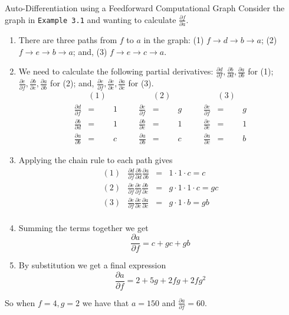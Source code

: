 \documentclass[11pt,a4paper]{article}
\begin{document}
  \begin{example}{Auto-Differentiation using a Feedforward Computational Graph}
    Consider the graph in \texttt{Example 3.1} and wanting to calculate $\frac{\partial f}{\partial a}$.
    \begin{enumerate}
      \item There are three paths from $f$ to $a$ in the graph: (1) $f\to d\to b\to a$; (2) $f\to e\to b\to a$; and, (3) $f\to e\to c\to a$.
      \item We need to calculate the following partial derivatives: $\frac{\partial d}{\partial f},\frac{\partial b}{\partial d},\frac{\partial a}{\partial b}$ for (1); $\frac{\partial e}{\partial f},\frac{\partial b}{\partial e},\frac{\partial a}{\partial b}$ for (2); and, $\frac{\partial e}{\partial f},\frac{\partial c}{\partial e},\frac{\partial a}{\partial c}$ for (3).
      \[\begin{array}{rclcrclcrcl}
        &(1)&&&&(2)&&&&(3)\\
        \frac{\partial d}{\partial f}&=&1&\quad&\frac{\partial e}{\partial f}&=&g&\quad&\frac{\partial e}{\partial f}&=&g\\
        \frac{\partial b}{\partial d}&=&1&\quad&\frac{\partial b}{\partial e}&=&1&\quad&\frac{\partial c}{\partial e}&=&1\\
        \frac{\partial a}{\partial b}&=&c&\quad&\frac{\partial a}{\partial b}&=&c&\quad&\frac{\partial a}{\partial c}&=&b
      \end{array}\]
      \item Applying the chain rule to each path gives
      \[\begin{array}{rrcl}
        (1)&\frac{\partial d}{\partial f}\frac{\partial b}{\partial d}\frac{\partial a}{\partial b}&=&1\cdot1\cdot c=c\\
        (2)&\frac{\partial e}{\partial f}\frac{\partial e}{\partial f}\frac{\partial b}{\partial e}&=&g\cdot1\cdot1\cdot c=gc\\
        (3)&\frac{\partial e}{\partial f}\frac{\partial c}{\partial e}\frac{\partial a}{\partial c}&=&g\cdot1\cdot b=gb\\
      \end{array}\]
      \item Summing the terms together we get
      \[ \frac{\partial a}{\partial f}=c+gc+gb \]
      \item By substitution we get a final expression
      \[ \frac{\partial a}{\partial f}=2+5g+2fg+2fg^2 \]
    \end{enumerate}
    So when $f=4,g=2$ we have that $a=150$ and $\frac{\partial a}{\partial f}=60$.
  \end{example}
\end{document}
